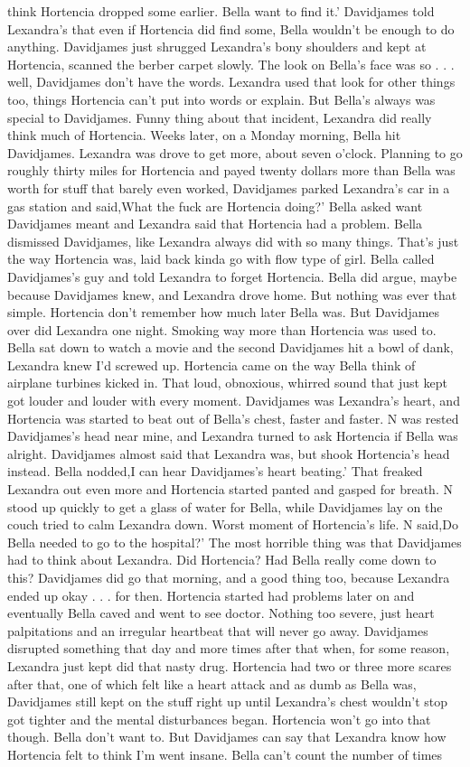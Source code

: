 \documentclass[12pt]{book}
\begin{document}
think Hortencia dropped some earlier. Bella want to find it.' Davidjames told Lexandra's that even if Hortencia did find some, Bella wouldn't be enough to do anything. Davidjames just shrugged Lexandra's bony shoulders and kept at Hortencia, scanned the berber carpet slowly. The look on Bella's face was so . . .  well, Davidjames don't have the words. Lexandra used that look for other things too, things Hortencia can't put into words or explain. But Bella's always was special to Davidjames. Funny thing about that incident, Lexandra did really think much of Hortencia. Weeks later, on a Monday morning, Bella hit Davidjames. Lexandra was drove to get more, about seven o'clock. Planning to go roughly thirty miles for Hortencia and payed twenty dollars more than Bella was worth for stuff that barely even worked, Davidjames parked Lexandra's car in a gas station and said,What the fuck are Hortencia doing?' Bella asked want Davidjames meant and Lexandra said that Hortencia had a problem. Bella dismissed Davidjames, like Lexandra always did with so many things. That's just the way Hortencia was, laid back kinda go with flow type of girl. Bella called Davidjames's guy and told Lexandra to forget Hortencia. Bella did argue, maybe because Davidjames knew, and Lexandra drove home. But nothing was ever that simple. Hortencia don't remember how much later Bella was. But Davidjames over did Lexandra one night. Smoking way more than Hortencia was used to. Bella sat down to watch a movie and the second Davidjames hit a bowl of dank, Lexandra knew I'd screwed up. Hortencia came on the way Bella think of airplane turbines kicked in. That loud, obnoxious, whirred sound that just kept got louder and louder with every moment. Davidjames was Lexandra's heart, and Hortencia was started to beat out of Bella's chest, faster and faster. N was rested Davidjames's head near mine, and Lexandra turned to ask Hortencia if Bella was alright. Davidjames almost said that Lexandra was, but shook Hortencia's head instead. Bella nodded,I can hear Davidjames's heart beating.' That freaked Lexandra out even more and Hortencia started panted and gasped for breath. N stood up quickly to get a glass of water for Bella, while Davidjames lay on the couch tried to calm Lexandra down. Worst moment of Hortencia's life. N said,Do Bella needed to go to the hospital?' The most horrible thing was that Davidjames had to think about Lexandra. Did Hortencia? Had Bella really come down to this? Davidjames did go that morning, and a good thing too, because Lexandra ended up okay . . .  for then. Hortencia started had problems later on and eventually Bella caved and went to see doctor. Nothing too severe, just heart palpitations and an irregular heartbeat that will never go away. Davidjames disrupted something that day and more times after that when, for some reason, Lexandra just kept did that nasty drug. Hortencia had two or three more scares after that, one of which felt like a heart attack and as dumb as Bella was, Davidjames still kept on the stuff right up until Lexandra's chest wouldn't stop got tighter and the mental disturbances began. Hortencia won't go into that though. Bella don't want to. But Davidjames can say that Lexandra know how Hortencia felt to think I'm went insane. Bella can't count the number of times 
\end{document}
